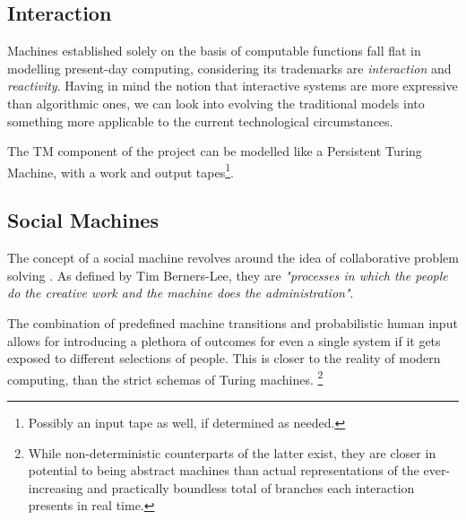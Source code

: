\documentclass[12pt,a4,xcolor=table]{article}
\begin{document}
\subsection{Interaction}

Machines established solely on the basis of computable functions fall flat in modelling present-day computing, considering its trademarks are \textit{interaction} and \textit{reactivity}\cite{Goldin2004}. Having in mind the notion that interactive systems are more expressive than algorithmic ones\cite{Wegner1997}, we can look into evolving the traditional models into something more applicable to the current technological circumstances. 

The TM component of the project can be modelled like a Persistent Turing Machine, with a work and output tapes\footnote{Possibly an input tape as well, if determined as needed.}.


\subsection{Social Machines}
The concept of a social machine revolves around the idea of collaborative problem solving \cite{Luczak-Rosch2015}. As defined by  Tim Berners-Lee, they are \textit{"processes in which the people do the creative work and the machine does the administration"}\cite{berners2001weaving}.

 The combination of predefined machine transitions and probabilistic human input allows for introducing a plethora of outcomes for even a single system if it gets exposed to different selections of people. This is closer to the reality of modern computing, than the strict schemas of Turing machines. \footnote{While non-deterministic counterparts of the latter exist, they are closer in potential to being abstract machines than actual representations of the ever-increasing and practically boundless total of branches each interaction presents in real time.}
\end{document}

